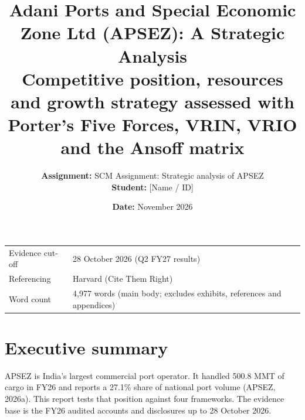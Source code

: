\documentclass[12pt, a4paper]{article}
\title{
\vspace*{2cm}
\Huge \textbf{Adani Ports and Special Economic Zone Ltd (APSEZ): A Strategic Analysis} \\
\vspace{0.5cm}
\Large Competitive position, resources and growth strategy assessed with Porter's Five Forces, VRIN, VRIO and the Ansoff matrix
}
\author{
\textbf{Assignment:} SCM Assignment: Strategic analysis of APSEZ \\
\textbf{Student:} [Name / ID] \\
}
\date{\textbf{Date:} November 2026}
\begin{document}

\maketitle
\thispagestyle{empty}
\vspace{2cm}
\begin{center}
\renewcommand{\arraystretch}{1.4}
\begin{tabular}{@{}lp{10cm}@{}}
\toprule
Evidence cut-off & 28 October 2026 (Q2 FY27 results) \\
Referencing      & Harvard (Cite Them Right) \\
Word count       & 4,977 words (main body; excludes exhibits, references and appendices) \\
\bottomrule
\end{tabular}
\end{center}
\newpage

\tableofcontents
\vspace{1cm}
\newpage
{}

\section{Executive summary}\label{sec:summary}
APSEZ is India's largest commercial port operator. It handled 500.8 MMT of
cargo in FY26 and reports a 27.1\% share of national port volume (APSEZ,
2026a). This report tests that position against four frameworks. The evidence
base is the FY26 audited accounts and disclosures up to 28 October 2026.
\end{document}
